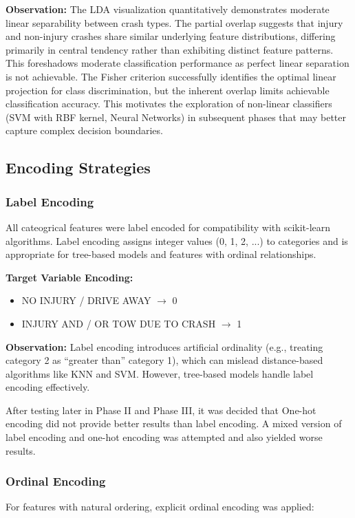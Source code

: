 \documentclass[stu,12pt,floatsintext]{apa7}
\begin{document}
\textbf{Observation:} The LDA visualization quantitatively demonstrates moderate linear separability between crash types. The partial 
overlap suggests that injury and non-injury crashes share similar underlying feature distributions, differing primarily in central 
tendency rather than exhibiting distinct feature patterns. This foreshadows moderate classification performance  
as perfect linear separation is not achievable. The Fisher criterion successfully identifies the optimal linear projection for class 
discrimination, but the inherent overlap limits achievable classification accuracy. This motivates the exploration of non-linear classifiers 
(SVM with RBF kernel, Neural Networks) in subsequent phases that may better capture complex decision boundaries.

\subsection{Encoding Strategies}

\subsubsection{Label Encoding}

All cateogrical features were label encoded for compatibility with scikit-learn algorithms. Label encoding assigns integer values 
(0, 1, 2, ...) to categories and is appropriate for tree-based models and features with ordinal relationships.

\textbf{Target Variable Encoding:}
\begin{itemize}
    \item NO INJURY / DRIVE AWAY $\rightarrow$ 0
    \item INJURY AND / OR TOW DUE TO CRASH $\rightarrow$ 1
\end{itemize}

\textbf{Observation:} Label encoding introduces artificial ordinality (e.g., treating category 2 as ``greater than'' category 1), which 
can mislead distance-based algorithms like KNN and SVM. However, tree-based models handle label encoding effectively.

After testing later in Phase II and Phase III, it was decided that One-hot encoding did not provide better results than label encoding. 
A mixed version of label encoding and one-hot encoding was attempted and also yielded worse results.

\subsubsection{Ordinal Encoding}
For features with natural ordering, explicit ordinal encoding was applied:
\end{document}
